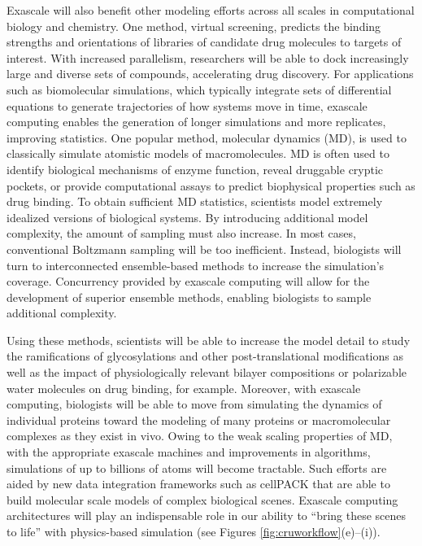 \par Exascale will also benefit other modeling efforts across all scales in computational biology and chemistry. One method, virtual screening, predicts the binding strengths and orientations of libraries of candidate drug molecules to targets of interest. With increased parallelism, researchers will be able to dock increasingly large and diverse sets of compounds, accelerating drug discovery. For applications such as biomolecular simulations, which typically integrate sets of differential equations to generate trajectories of how systems move in time, exascale computing enables the generation of longer simulations and more replicates, improving statistics. One popular method, molecular dynamics (MD), is used to classically simulate atomistic models of macromolecules. MD is often used to identify biological mechanisms of enzyme function, reveal druggable cryptic pockets, or provide computational assays to predict biophysical properties such as drug binding\cite{Liu2018,Durrant2011a,DeVivo2016}. To obtain sufficient MD statistics, scientists model extremely idealized versions of biological systems. By introducing additional model complexity, the amount of sampling must also increase. In most cases, conventional Boltzmann sampling will be too inefficient. Instead, biologists will turn to interconnected ensemble-based methods to increase the simulation's coverage. Concurrency provided by exascale computing will allow for the development of superior ensemble methods, enabling biologists to sample additional complexity.
\par Using these methods, scientists will be able to increase the model detail to study the ramifications of glycosylations and other post-translational modifications as well as the impact of physiologically relevant bilayer compositions or polarizable water molecules on drug binding, for example. Moreover, with exascale computing, biologists will be able to move from simulating the dynamics of individual proteins toward the modeling of many proteins or macromolecular complexes as they exist in vivo. Owing to the weak scaling properties of MD, with the appropriate exascale machines and improvements in algorithms, simulations of up to billions of atoms will become tractable. Such efforts are aided by new data integration frameworks such as cellPACK\cite{Johnson2015} that are able to build molecular scale models of complex biological scenes. Exascale computing architectures will play an indispensable role in our ability to ``bring these scenes to life'' with physics-based simulation (see Figures \ref{fig:cruworkflow}(e)–(i)).

